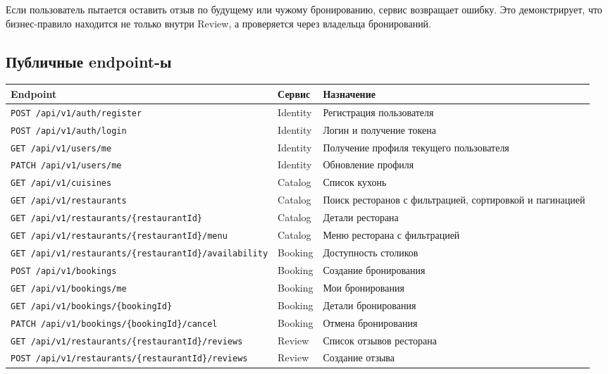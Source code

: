 \documentclass[14pt,a4paper]{extarticle}
\newcommand{\pathcode}[1]{{\footnotesize\nolinkurl{#1}}}
\begin{document}
Если пользователь пытается оставить отзыв по будущему или чужому бронированию, сервис возвращает ошибку. Это демонстрирует, что бизнес-правило находится не только внутри Review, а проверяется через владельца бронирований.

\subsection{Публичные endpoint-ы}

\begin{longtable}{|L{0.44\textwidth}|L{0.18\textwidth}|L{0.28\textwidth}|}
\hline
\textbf{Endpoint} & \textbf{Сервис} & \textbf{Назначение} \\
\hline
\pathcode{POST /api/v1/auth/register} & Identity & Регистрация пользователя \\
\hline
\pathcode{POST /api/v1/auth/login} & Identity & Логин и получение токена \\
\hline
\pathcode{GET /api/v1/users/me} & Identity & Получение профиля текущего пользователя \\
\hline
\pathcode{PATCH /api/v1/users/me} & Identity & Обновление профиля \\
\hline
\pathcode{GET /api/v1/cuisines} & Catalog & Список кухонь \\
\hline
\pathcode{GET /api/v1/restaurants} & Catalog & Поиск ресторанов с фильтрацией, сортировкой и пагинацией \\
\hline
\pathcode{GET /api/v1/restaurants/{restaurantId}} & Catalog & Детали ресторана \\
\hline
\pathcode{GET /api/v1/restaurants/{restaurantId}/menu} & Catalog & Меню ресторана с фильтрацией \\
\hline
\pathcode{GET /api/v1/restaurants/{restaurantId}/availability} & Booking & Доступность столиков \\
\hline
\pathcode{POST /api/v1/bookings} & Booking & Создание бронирования \\
\hline
\pathcode{GET /api/v1/bookings/me} & Booking & Мои бронирования \\
\hline
\pathcode{GET /api/v1/bookings/{bookingId}} & Booking & Детали бронирования \\
\hline
\pathcode{PATCH /api/v1/bookings/{bookingId}/cancel} & Booking & Отмена бронирования \\
\hline
\pathcode{GET /api/v1/restaurants/{restaurantId}/reviews} & Review & Список отзывов ресторана \\
\hline
\pathcode{POST /api/v1/restaurants/{restaurantId}/reviews} & Review & Создание отзыва \\
\hline
\end{longtable}
\end{document}

